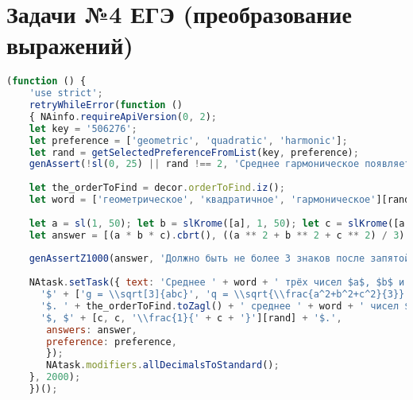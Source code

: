 
\section{Задачи №4 ЕГЭ (преобразование выражений)}
\begin{lstlisting}[language=JavaScript]
(function () { 
    'use strict'; 
    retryWhileError(function () 
    { NAinfo.requireApiVersion(0, 2); 
    let key = '506276'; 
    let preference = ['geometric', 'quadratic', 'harmonic']; 
    let rand = getSelectedPreferenceFromList(key, preference);
    genAssert(!sl(0, 25) || rand !== 2, 'Среднее гармоническое появляется слишком часто'); 
     
    let the_orderToFind = decor.orderToFind.iz(); 
    let word = ['геометрическое', 'квадратичное', 'гармоническое'][rand]; 
     
    let a = sl(1, 50); let b = slKrome([a], 1, 50); let c = slKrome([a, b], 1, 50); 
    let answer = [(a * b * c).cbrt(), ((a ** 2 + b ** 2 + c ** 2) / 3).sqrt(), 3 / (a + b + c)][rand];
     
    genAssertZ1000(answer, 'Должно быть не более 3 знаков после запятой'); 
     
    NAtask.setTask({ text: 'Среднее ' + word + ' трёх чисел $a$, $b$ и $c$ вычисляется по формуле ' +
      '$' + ['g = \\sqrt[3]{abc}', 'q = \\sqrt{\\frac{a^2+b^2+c^2}{3}}', 'h = \\left(\\frac{\\frac{1}{a}+\\frac{1}{b}+\\frac{1}{c}}{3} \\right)^{-1}'][rand] + '$.' +
      '$. ' + the_orderToFind.toZagl() + ' среднее ' + word + ' чисел $' + [a, a, '\\frac{1}{' + a + '}'][rand] + '$, $' + [b, b, '\\frac{1}{' + b + '}'][rand] + 
      '$, $' + [c, c, '\\frac{1}{' + c + '}'][rand] + '$.',
       answers: answer, 
       preference: preference, 
       }); 
       NAtask.modifiers.allDecimalsToStandard();
    }, 2000); 
    })();
\end{lstlisting}